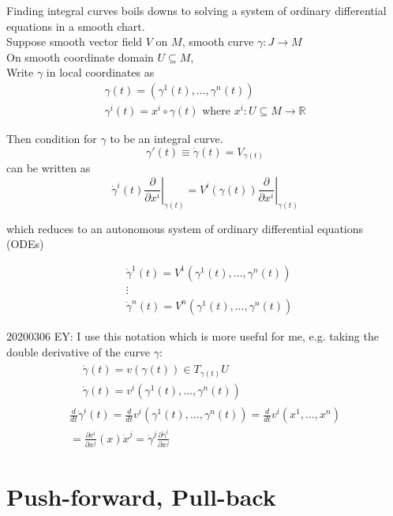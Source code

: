 \documentclass[10pt]{amsart}
\begin{document}
\begin{multicols*}{2}
Finding integral curves boils downs to solving a system of ordinary differential equations in a smooth chart. \\
Suppose smooth vector field $V$ on $M$, smooth curve $\gamma : J \to M$ \\
On smooth coordinate domain $U \subseteq M$, \\
Write $\gamma$ in local coordinates as 
\[
\begin{gathered}
	\gamma(t) = (\gamma^{1}(t), \dots , \gamma^{n}(t)) \\
	\gamma^i(t) = x^i \circ \gamma(t) \text{ where } x^i : U \subseteq M \to \mathbb{R} 
\end{gathered}
\]

Then condition for $\gamma$ to be an integral curve.
\[
\gamma'(t) \equiv \dot{\gamma}(t) = V_{\gamma(t)}
\]
can be written as 
\[
\dot{\gamma}^i(t) \left. \frac{\partial}{\partial x^i} \right|_{\gamma(t)} = V^i(\gamma(t)) \left. \frac{\partial }{ \partial x^i } \right|_{\gamma(t)}
\]

which reduces to an autonomous system of ordinary differential equations (ODEs)

\begin{equation}
\begin{aligned} 
& \dot{\gamma}^1(t) = V^1(\gamma^1(t), \dots, \gamma^n(t)) \\ 
& \vdots \\ 
& \dot{\gamma}^n(t) = V^n(\gamma^1(t), \dots , \gamma^n(t))
\end{aligned} 
\end{equation}

20200306 EY: I use this notation which is more useful for me, e.g. taking the double derivative of the curve $\gamma$: 
\[
\begin{gathered} 
\begin{aligned} 
& \dot{\gamma}(t) = v(\gamma(t)) \in T_{\gamma(t)}U \\ 
& \dot{\gamma}(t) = v^i(\gamma^1(t), \dots, \gamma^n(t))
\end{aligned} \\ 
\frac{d}{dt} \dot{\gamma}^i(t) = \frac{d}{dt} v^i(\gamma^1(t), \dots , \gamma^n(t)) = \frac{d}{dt} v^i(x^1 , \dots , x^n) \\
= \frac{\partial v^i}{\partial x^j}(x) \dot{x}^j = \dot{\gamma}^j \frac{\partial \dot{\gamma}^i}{\partial x^j}
\end{gathered} 
\]

\section{Push-forward, Pull-back}


\end{multicols*}
\end{document}
